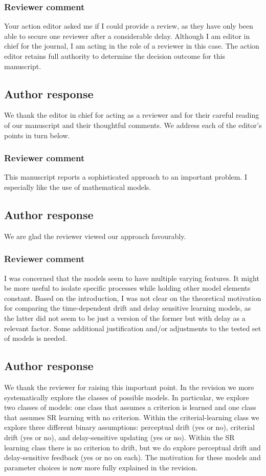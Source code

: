 \documentclass[12pt]{article}
\begin{document}
\subsubsection{Reviewer comment}
Your action editor asked me if I could provide a review, as
they have only been able to secure one reviewer after a
considerable delay. Although I am editor in chief for the
journal, I am acting in the role of a reviewer in this case.
The action editor retains full authority to determine the
decision outcome for this manuscript.

\subsection{Author response}
We thank the editor in chief for acting as a reviewer and for
their careful reading of our manuscript and their thoughtful
comments. We address each of the editor's points in turn
below.

\subsubsection{Reviewer comment}
This manuscript reports a sophisticated approach to an
important problem. I especially like the use of mathematical
models.

\subsection{Author response}
We are glad the reviewer viewed our approach favourably.

\subsubsection{Reviewer comment}
I was concerned that the models seem to have multiple
varying features. It might be more useful to isolate
specific processes while holding other model elements
constant. Based on the introduction, I was not clear on the
theoretical motivation for comparing the time-dependent
drift and delay sensitive learning models, as the latter did
not seem to be just a version of the former but with delay
as a relevant factor. Some additional justification and/or
adjustments to the tested set of models is needed.

\subsection{Author response}
We thank the reviewer for raising this important point. In
the revision we more systematically explore the classes of
possible models.  In particular, we explore two classes of
models: one class that assumes a criterion is learned and
one class that assumes SR learning with no criterion.
Within the criterial-learning class we explore three
different binary assumptions: perceptual drift (yes or no),
criterial drift (yes or no), and delay-sensitive updating
(yes or no).  Within the SR learning class there is no
criterion to drift, but we do explore perceptual drift and
delay-sensitive feedback (yes or no on each). The motivation
for these models and parameter choices is now more fully
explained in the revision.
\end{document}
